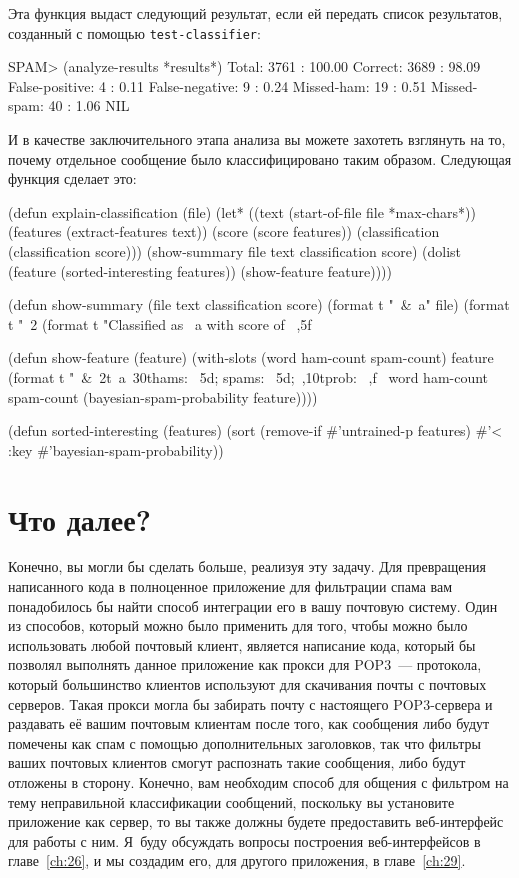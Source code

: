 Эта функция выдаст следующий результат, если ей передать список результатов, созданный с
помощью \lstinline{test-classifier}:

\begin{myverb}
SPAM> (analyze-results *results*)
Total:               3761 : 100.00%
Correct:             3689 :  98.09%
False-positive:         4 :   0.11%
False-negative:         9 :   0.24%
Missed-ham:            19 :   0.51%
Missed-spam:           40 :   1.06%
NIL
\end{myverb}

И в качестве заключительного этапа анализа вы можете захотеть взглянуть на то, почему
отдельное сообщение было классифицировано таким образом.  Следующая функция сделает это:

\begin{myverb}
(defun explain-classification (file)
  (let* ((text (start-of-file file *max-chars*))
         (features (extract-features text))
         (score (score features))
         (classification (classification score)))
    (show-summary file text classification score)
    (dolist (feature (sorted-interesting features))
      (show-feature feature))))

(defun show-summary (file text classification score)
  (format t "~&~a" file)
  (format t "~2%
  (format t "Classified as ~a with score of ~,5f~%

(defun show-feature (feature)
  (with-slots (word ham-count spam-count) feature
    (format
     t "~&~2t~a~30thams: ~5d; spams: ~5d;~,10tprob: ~,f~%
     word ham-count spam-count (bayesian-spam-probability feature))))

(defun sorted-interesting (features)
  (sort (remove-if #'untrained-p features) #'< :key #'bayesian-spam-probability))
\end{myverb}

\section{Что далее?}

Конечно, вы могли бы сделать больше, реализуя эту задачу.  Для превращения напи\-сан\-ного кода
в полноценное приложение для фильтрации спама вам понадобилось бы найти способ интеграции
его в вашу почтовую систему.  Один из способов, который можно было применить для того,
чтобы можно было использовать любой почтовый клиент, является написание кода, который бы
позволял выполнять данное приложение как прокси для POP3~--- протокола, который
большинство клиентов используют для скачивания почты с почтовых серверов.  Такая прокси
могла бы забирать почту с настоящего POP3-сервера и раздавать её вашим почтовым клиентам
после того, как сообщения либо будут помечены как спам с помощью дополнительных
заголовков, так что фильтры ваших почтовых клиентов смогут распознать такие сообщения,
либо будут отложены в сторону.  Конечно, вам необходим способ для общения с фильтром на
тему неправильной классификации сообщений, поскольку вы установите приложение как
сервер, то вы также должны будете предоставить веб-интерфейс для работы с ним.  Я~буду
обсуждать вопросы построения веб-интерфейсов в главе~\ref{ch:26}, и мы создадим его, для
другого приложения, в главе~\ref{ch:29}.

